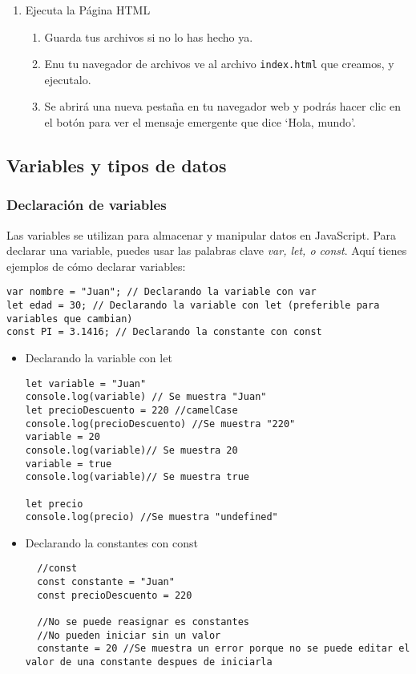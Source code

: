 \documentclass[executivepaper]{article}
\begin{document}
\begin{enumerate}
  \item Ejecuta la Página HTML
\begin{enumerate}
  \item Guarda tus archivos si no lo has hecho ya.
  \item Enu tu navegador de archivos ve al archivo \lstinline{index.html} que creamos, y ejecutalo.
  \item  Se abrirá una nueva pestaña en tu navegador web y podrás hacer clic en el botón para ver el mensaje emergente que dice \enquote*{Hola, mundo}.
\end{enumerate}

\end{enumerate}

\subsection{ Variables y tipos de datos}
\subsubsection*{Declaración de variables}
Las variables se utilizan para almacenar y manipular datos en JavaScript. Para declarar una variable, puedes usar las palabras clave \emph{var, let, o const}. Aquí tienes ejemplos de cómo declarar variables:

\begin{lstlisting}
var nombre = "Juan"; // Declarando la variable con var
let edad = 30; // Declarando la variable con let (preferible para variables que cambian)
const PI = 3.1416; // Declarando la constante con const
\end{lstlisting}

\begin{itemize}
  \item Declarando la variable con let
\begin{lstlisting}
let variable = "Juan"
console.log(variable) // Se muestra "Juan"
let precioDescuento = 220 //camelCase
console.log(precioDescuento) //Se muestra "220"
variable = 20
console.log(variable)// Se muestra 20
variable = true
console.log(variable)// Se muestra true

let precio
console.log(precio) //Se muestra "undefined"
\end{lstlisting}
  \item Declarando la constantes con const
\begin{lstlisting}
  //const
  const constante = "Juan"
  const precioDescuento = 220
  
  //No se puede reasignar es constantes
  //No pueden iniciar sin un valor
  constante = 20 //Se muestra un error porque no se puede editar el valor de una constante despues de iniciarla
\end{lstlisting}
\end{itemize}
\end{document}
